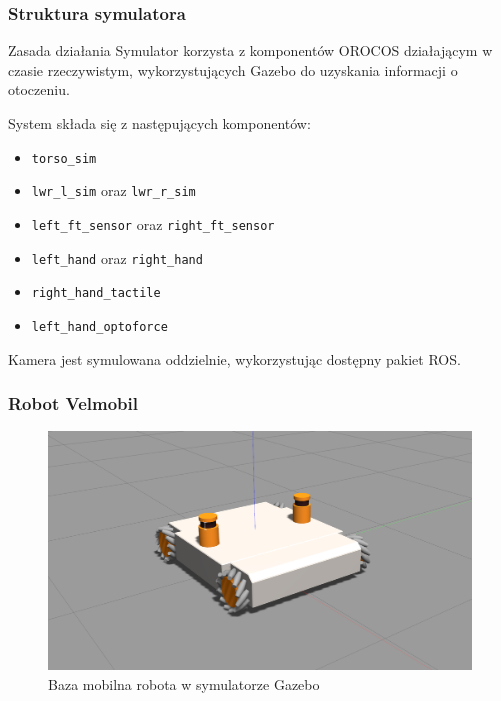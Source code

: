 
\begin{frame}
\frametitle{Struktura symulatora}
\begin{block}{Zasada działania}
	Symulator korzysta z komponentów OROCOS działającym w czasie rzeczywistym, wykorzystujących Gazebo
	do uzyskania informacji o otoczeniu.
\end{block}
\medskip
System składa się z następujących komponentów:
\begin{itemize}
	\item \texttt{torso\_{}sim}
	\item \texttt{lwr\_{}l\_{}sim} oraz \texttt{lwr\_{}r\_{}sim}
	\item \texttt{left\_{}ft\_{}sensor} oraz \texttt{right\_{}ft\_{}sensor}
	\item \texttt{left\_{}hand} oraz \texttt{right\_{}hand}
	\item \texttt{right\_{}hand\_{}tactile}
	\item \texttt{left\_{}hand\_{}optoforce}
\end{itemize}
Kamera jest symulowana oddzielnie, wykorzystując dostępny pakiet ROS.
\end{frame}


\begin{frame}
\frametitle{Robot Velmobil}
\begin{figure}
\includegraphics[scale=0.20]{./images/omnivelma_gz.png}
\caption{Baza mobilna robota w symulatorze Gazebo}
\end{figure}
\end{frame}


